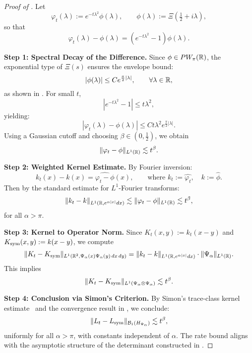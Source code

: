 \begin{proof}[Proof of ]
Let
\[
\varphi_t(\lambda) := e^{-t\lambda^2} \phi(\lambda), \qquad \phi(\lambda) := \Xi\left( \tfrac{1}{2} + i\lambda \right),
\]
so that
\[
\varphi_t(\lambda) - \phi(\lambda) = (e^{-t\lambda^2} - 1)\phi(\lambda).
\]

\smallskip
\noindent\textbf{Step 1: Spectral Decay of the Difference.}  
Since \( \phi \in PW_\pi(\mathbb{R}) \), the exponential type of \( \Xi(s) \) ensures the envelope bound:
\[
|\phi(\lambda)| \le C e^{\frac{\pi}{2} |\lambda|}, \qquad \forall \lambda \in \mathbb{R},
\]
as shown in . For small \( t \),
\[
|e^{-t\lambda^2} - 1| \le t \lambda^2,
\]
yielding:
\[
|\varphi_t(\lambda) - \phi(\lambda)| \le C t \lambda^2 e^{\frac{\pi}{2}|\lambda|}.
\]
Using a Gaussian cutoff and choosing \( \beta \in (0, \tfrac{1}{2}) \), we obtain
\[
\| \varphi_t - \phi \|_{L^1(\mathbb{R})} \lesssim t^\beta.
\]

\smallskip
\noindent\textbf{Step 2: Weighted Kernel Estimate.}  
By Fourier inversion:
\[
k_t(x) - k(x) = \widehat{\varphi_t - \phi}(x), \qquad \text{where } k_t := \widehat{\varphi_t}, \quad k := \widehat{\phi}.
\]
Then by the standard estimate for \( L^1 \)-Fourier transforms:
\[
\| k_t - k \|_{L^1(\mathbb{R}, e^{\alpha |x|} dx)} \lesssim \| \varphi_t - \phi \|_{L^1(\mathbb{R})} \lesssim t^\beta,
\]
for all \( \alpha > \pi \).

\smallskip
\noindent\textbf{Step 3: Kernel to Operator Norm.}  
Since \( K_t(x,y) := k_t(x - y) \) and \( K_{\mathrm{sym}}(x,y) := k(x - y) \), we compute
\[
\| K_t - K_{\mathrm{sym}} \|_{L^1(\mathbb{R}^2, \Psi_\alpha(x) \Psi_\alpha(y)\, dx\, dy)}
= \| k_t - k \|_{L^1(\mathbb{R}, e^{\alpha |x|} dx)} \cdot \| \Psi_\alpha \|_{L^1(\mathbb{R})}.
\]
This implies
\[
\| K_t - K_{\mathrm{sym}} \|_{L^1(\Psi_\alpha \otimes \Psi_\alpha)} \lesssim t^\beta.
\]

\smallskip
\noindent\textbf{Step 4: Conclusion via Simon’s Criterion.}  
By Simon’s trace-class kernel estimate~\cite[Thm.~4.2]{Simon2005TraceIdeals} and the convergence result in , we conclude:
\[
\| L_t - L_{\mathrm{sym}} \|_{\mathcal{B}_1(H_{\Psi_\alpha})} \lesssim t^\beta,
\]
uniformly for all \( \alpha > \pi \), with constants independent of \( \alpha \). The rate bound aligns with the asymptotic structure of the determinant constructed in .
\end{proof}

